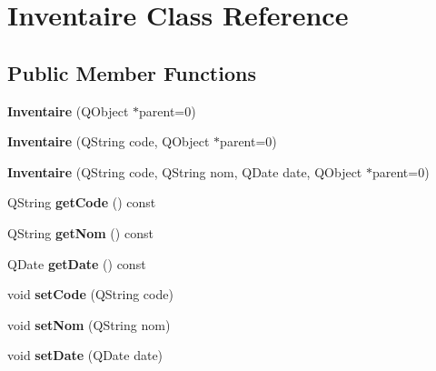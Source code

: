 \hypertarget{class_inventaire}{
\section{Inventaire Class Reference}
\label{df/d54/class_inventaire}
}
\subsection*{Public Member Functions}
\begin{DoxyCompactItemize}
\item 
\hypertarget{class_inventaire_a0699dc0dc12b05ce13f2961da72d5502}{
{\bfseries Inventaire} (QObject $\ast$parent=0)}
\label{df/d54/class_inventaire_a0699dc0dc12b05ce13f2961da72d5502}

\item 
\hypertarget{class_inventaire_a85297593d9f9e7c619a3b642c26e37f8}{
{\bfseries Inventaire} (QString code, QObject $\ast$parent=0)}
\label{df/d54/class_inventaire_a85297593d9f9e7c619a3b642c26e37f8}

\item 
\hypertarget{class_inventaire_a96acba0f5cd94b713941d7a4e8d859f3}{
{\bfseries Inventaire} (QString code, QString nom, QDate date, QObject $\ast$parent=0)}
\label{df/d54/class_inventaire_a96acba0f5cd94b713941d7a4e8d859f3}

\item 
\hypertarget{class_inventaire_a1cbccc9236ad06a4f94afdf2db148035}{
QString {\bfseries getCode} () const }
\label{df/d54/class_inventaire_a1cbccc9236ad06a4f94afdf2db148035}

\item 
\hypertarget{class_inventaire_a65871bc4cc574eaf2e883e42e7a45a99}{
QString {\bfseries getNom} () const }
\label{df/d54/class_inventaire_a65871bc4cc574eaf2e883e42e7a45a99}

\item 
\hypertarget{class_inventaire_a49cd84bfddb4b04b384ecd6ce193b2fd}{
QDate {\bfseries getDate} () const }
\label{df/d54/class_inventaire_a49cd84bfddb4b04b384ecd6ce193b2fd}

\item 
\hypertarget{class_inventaire_a7891243bb6229045e5f2e015354ffa3a}{
void {\bfseries setCode} (QString code)}
\label{df/d54/class_inventaire_a7891243bb6229045e5f2e015354ffa3a}

\item 
\hypertarget{class_inventaire_a0de81b001587b46e84ae0ddfe921b8e6}{
void {\bfseries setNom} (QString nom)}
\label{df/d54/class_inventaire_a0de81b001587b46e84ae0ddfe921b8e6}

\item 
\hypertarget{class_inventaire_aad4911f7d6cd6bd799233e05f645c033}{
void {\bfseries setDate} (QDate date)}
\label{df/d54/class_inventaire_aad4911f7d6cd6bd799233e05f645c033}

\end{DoxyCompactItemize}
